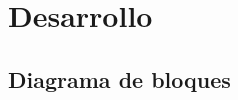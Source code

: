 \documentclass{article}
\begin{document}
    
    
    
    
    
    
    
    
    
    
    
    
    
    

 
  



\section{Desarrollo}

\subsection{Diagrama de bloques}
\end{document}
